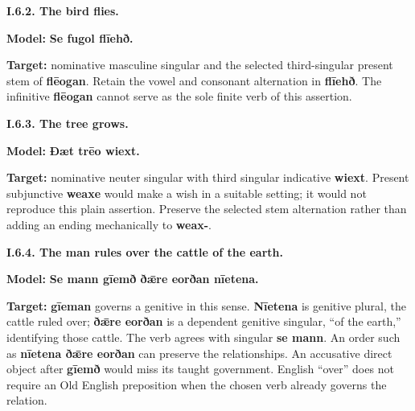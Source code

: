 \par\begin{minipage}{\linewidth}\raggedright
\textbf{I.6.2. The bird flies.}

\textbf{Model:} \textbf{Se fugol flīehð.}

\textbf{Target:} nominative masculine singular and the selected third-singular present stem of \textbf{flēogan}. Retain the vowel and consonant alternation in \textbf{flīehð}. The infinitive \textbf{flēogan} cannot serve as the sole finite verb of this assertion.

\end{minipage}\par\addvspace{4pt}

\par\begin{minipage}{\linewidth}\raggedright
\textbf{I.6.3. The tree grows.}

\textbf{Model:} \textbf{Ðæt trēo wiext.}

\textbf{Target:} nominative neuter singular with third singular indicative \textbf{wiext}. Present subjunctive \textbf{weaxe} would make a wish in a suitable setting; it would not reproduce this plain assertion. Preserve the selected stem alternation rather than adding an ending mechanically to \textbf{weax-}.

\end{minipage}\par\addvspace{4pt}

\par\begin{minipage}{\linewidth}\raggedright
\textbf{I.6.4. The man rules over the cattle of the earth.}

\textbf{Model:} \textbf{Se mann gīemð ðǣre eorðan nīetena.}

\textbf{Target:} \textbf{gīeman} governs a genitive in this sense. \textbf{Nīetena} is genitive plural, the cattle ruled over; \textbf{ðǣre eorðan} is a dependent genitive singular, “of the earth,” identifying those cattle. The verb agrees with singular \textbf{se mann}. An order such as \textbf{nīetena ðǣre eorðan} can preserve the relationships. An accusative direct object after \textbf{gīemð} would miss its taught government. English “over” does not require an Old English preposition when the chosen verb already governs the relation.

\end{minipage}\par\addvspace{4pt}

